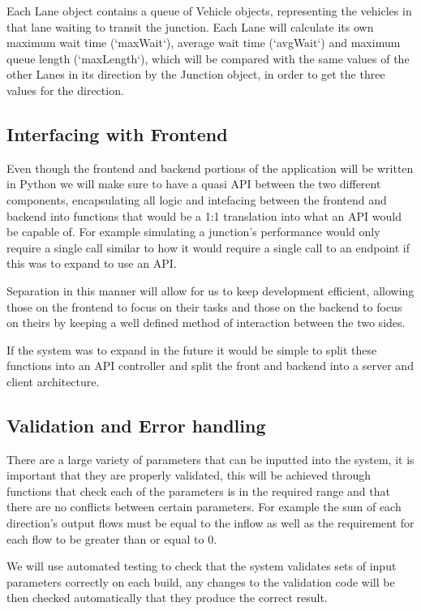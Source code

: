 \documentclass{article}
\begin{document}
Each Lane object contains a queue of Vehicle objects, representing the vehicles in that lane waiting to transit the junction. Each Lane 
will calculate its own maximum wait time (`maxWait`), average wait time (`avgWait`) and maximum queue length (`maxLength`), which will be 
compared with the same values of the other Lanes in its direction by the Junction object, in order to get the three values for the direction.

\subsection{Interfacing with Frontend}

Even though the frontend and backend portions of the application will be 
written in Python we will make sure to have a quasi API between the two 
different components, encapsulating all logic and intefacing between the 
frontend and backend into functions that would be a 1:1 translation into 
what an API would be capable of. For example simulating a junction's 
performance would only require a single call similar to how it would require 
a single call to an endpoint if this was to expand to use an API.

Separation in this manner will allow for us to keep development efficient, 
allowing those on the frontend to focus on their tasks and those on the 
backend to focus on theirs by keeping a well defined method of interaction 
between the two sides.

If the system was to expand in the future it would be simple to split these 
functions into an API controller and split the front and backend into a 
server and client architecture.

\subsection{Validation and Error handling}

There are a large variety of parameters that can be inputted into the system, it is 
important that they are properly validated, this will be achieved through functions 
that check each of the parameters is in the required range and that there are no 
conflicts between certain parameters. For example the sum of each direction's output 
flows must be equal to the inflow as well as the requirement for each flow to be 
greater than or equal to 0. 

We will use automated testing to check that the system validates sets of input 
parameters correctly on each build, any changes to the validation code will be then 
checked automatically that they produce the correct result. 
\end{document}
